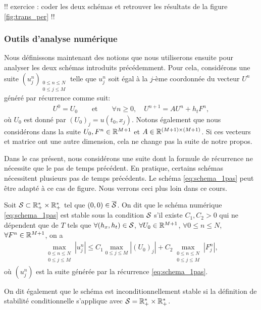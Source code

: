 \documentclass[12pt,a4paper,twoside]{article}
\begin{document}
!! exercice : coder les deux sch\'emas et retrouver les r\'esultats
de la figure \ref{fig:trans_per} !!

\subsubsection{Outils d'analyse num\'erique}

Nous d\'efinissons maintenant des notions que nous
utiliserons ensuite pour analyser les deux sch\'emas introduits pr\'ec\'edemment.
Pour cela, consid\'erons une suite $(u_j^n)_{\substack{0 \leq n \leq N \\ 0 \leq j \leq M}}$
telle que $u_j^n$ soit \'egal \`a la $j$-\`eme coordonn\'ee du vecteur
$U^n$ g\'en\'er\'e par r\'ecurrence comme suit:
\begin{align}
  \label{eq:schema_1pas}
  U^0 = U_0 \qquad \text{et} \qquad \forall n \geq 0, \quad U^{n+1} = A U^n + h_t F^n ,
\end{align}
o\`u $U_0$ est donn\'e par $(U_0)_j = u(t_0,x_j)$.
Notons \'egalement que nous consid\'erons dans la suite
$U_0, F^n \in \mathbb{R}^{M+1}$ et $A \in \mathbb{R}^{(M+1)\times(M+1)}$.
Si ces vecteurs et matrice ont une autre dimension, cela ne change pas la suite de
notre propos.

\begin{remark}
  Dans le cas pr\'esent, nous consid\'erons une suite dont la formule de r\'ecurrence
  ne n\'ecessite que le pas de temps pr\'ec\'edent.
  En pratique, certains sch\'emas n\'ecessitent plusieurs pas de temps pr\'ec\'edents.
  Le sch\'ema \eqref{eq:schema_1pas} peut \^etre adapt\'e \`a ce cas de figure.
  Nous verrons ceci plus loin dans ce cours.
\end{remark}

\begin{definition}[Stabilit\'e]
  \label{def:stabilite}
  Soit $\mathcal{S} \subset \mathbb{R}_+^* \times \mathbb{R}_+^*$ tel que $(0,0) \in \overline{\mathcal{S}}$.
  On dit que le sch\'ema num\'erique \eqref{eq:schema_1pas} est stable 
  sous la condition $\mathcal{S}$ s'il existe $C_1 , C_2 > 0$ qui ne d\'ependent que de $T$
  tels que $\forall (h_x , h_t) \in \mathcal{S}$, $\forall U_0 \in \mathbb{R}^{M+1}$, 
  $\forall 0 \leq n \leq N$, $\forall F^n \in \mathbb{R}^{M+1}$, on a
  \begin{align}
    \max_{\substack{0\leq n \leq N\\ 0 \leq j \leq M}} | u_j^n | 
    \leq C_1 \max_{0 \leq j \leq M} | (U_0)_j | 
    + C_2 \max_{\substack{0\leq n \leq N\\ 0 \leq j \leq M}} | F_j^n | ,
  \end{align}
  o\`u $(u_j^n)$ est la suite g\'en\'er\'ee par la r\'ecurrence \eqref{eq:schema_1pas}.

  On dit \'egalement que le sch\'ema est inconditionnellement stable
  si la d\'efinition de stabilit\'e conditionnelle 
  s'applique avec $\mathcal{S} = \mathbb{R}_+^* \times \mathbb{R}_+^*$.
\end{definition}
\end{document}
